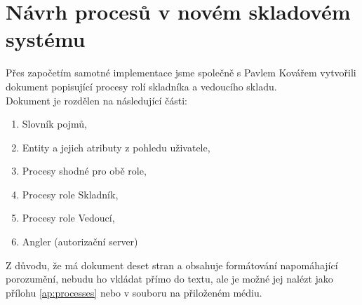 \section{Návrh procesů v novém skladovém systému}

Přes započetím samotné implementace jsme společně s Pavlem Kovářem vytvořili dokument popisující procesy rolí skladníka a vedoucího skladu.\\
Dokument je rozdělen na následující části:
\begin{enumerate}
	\item Slovník pojmů,
	\item Entity a jejich atributy z pohledu uživatele,
	\item Procesy shodné pro obě role,
	\item Procesy role Skladník,
	\item Procesy role Vedoucí,
	\item Angler (autorizační server)
\end{enumerate}
Z důvodu, že má dokument deset stran a obsahuje formátování napomáhající porozumění, nebudu ho vkládat přímo do textu, ale je možné jej nalézt jako přílohu \ref{ap:processes} nebo v souboru  na přiloženém médiu.
